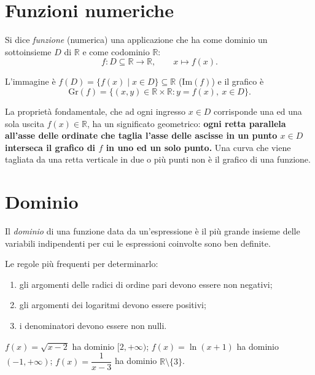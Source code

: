 \documentclass[11pt,a4paper]{article}
\begin{document}
\section{Funzioni numeriche}

\begin{definizione}
Si dice \emph{funzione} (numerica) una applicazione che ha come dominio un sottoinsieme $D$ di $\mathbb{R}$ e come codominio $\mathbb{R}$:
\[
f : D \subseteq \mathbb{R} \to \mathbb{R}, \qquad x \mapsto f(x).
\]
\end{definizione}

L'immagine è $f(D) = \{f(x) \mid x \in D\} \subseteq \mathbb{R}$ ($\mathrm{Im}(f)$) e il grafico è
\[
\mathrm{Gr}(f) = \{(x, y) \in \mathbb{R} \times \mathbb{R} : y = f(x),\ x \in D\}.
\]

La proprietà fondamentale, che ad ogni ingresso $x \in D$ corrisponde una ed una sola uscita $f(x) \in \mathbb{R}$, ha un significato geometrico: \textbf{ogni retta parallela all'asse delle ordinate che taglia l'asse delle ascisse in un punto $x \in D$ interseca il grafico di $f$ in uno ed un solo punto.} Una curva che viene tagliata da una retta verticale in due o più punti non è il grafico di una funzione.

\section{Dominio}

\begin{definizione}
Il \emph{dominio} di una funzione data da un'espressione è il più grande insieme delle variabili indipendenti per cui le espressioni coinvolte sono ben definite.
\end{definizione}

Le regole più frequenti per determinarlo:
\begin{enumerate}
    \item gli argomenti delle radici di ordine pari devono essere non negativi;
    \item gli argomenti dei logaritmi devono essere positivi;
    \item i denominatori devono essere non nulli.
\end{enumerate}

\begin{esempio}
$f(x) = \sqrt{x - 2}$ ha dominio $[2, +\infty)$; $f(x) = \ln(x + 1)$ ha dominio $(-1, +\infty)$; $f(x) = \dfrac{1}{x - 3}$ ha dominio $\mathbb{R} \setminus \{3\}$.
\end{esempio}
\end{document}
